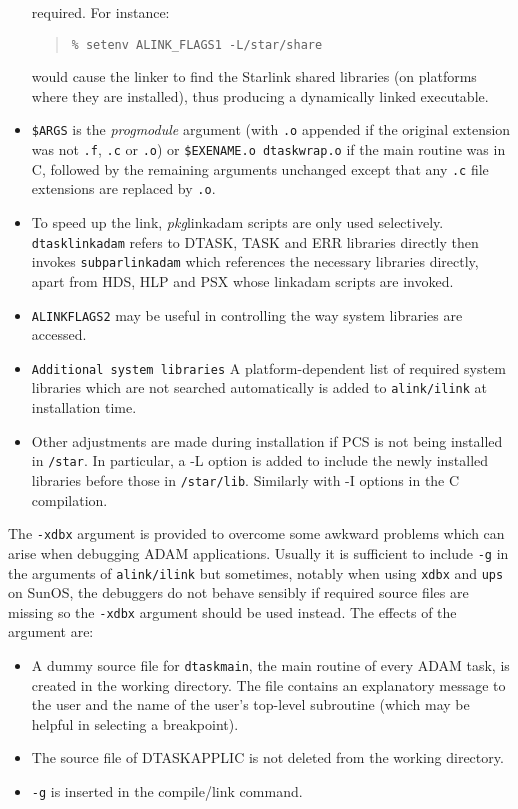 \documentclass[twoside,11pt]{article}
\renewcommand{\_}{\texttt{\symbol{95}}}
\begin{document}
\begin{itemize}
required. For instance:
\begin{quote} \begin{verbatim}
% setenv ALINK_FLAGS1 -L/star/share 
\end{verbatim} \end{quote}
would cause the linker to find the Starlink
shared libraries (on platforms where they are installed), thus producing a
dynamically linked executable.
\item \texttt{\$ARGS} is the \textit{prog\_module} argument (with \texttt{.o} 
appended if the original extension was not \texttt{.f}, \texttt{.c} or 
\texttt{.o})
or \texttt{\$EXENAME.o dtask\_wrap.o} if the main routine was in C, followed 
by the remaining arguments unchanged except that any \texttt{.c} file 
extensions are replaced by \texttt{.o}.
\item To speed up the link, \textit{pkg}\_link\_adam scripts are only used
selectively. 
\texttt{dtask\_link\_adam} refers to DTASK, TASK and ERR libraries directly then
invokes \texttt{subpar\_link\_adam} which references the necessary
libraries directly, apart from HDS, HLP and PSX whose link\_adam scripts are
invoked.
\item \texttt{ALINK\_FLAGS2} may be useful in controlling the way system
libraries are accessed.
\item \texttt{Additional system libraries} A platform-dependent list of 
required system libraries which are not searched automatically is added to 
\texttt{alink/ilink} at installation time.
\item Other adjustments are made during installation if PCS is not being
installed in \texttt{/star}. 
In particular, a -L option is added to include the newly installed libraries 
before those in \texttt{/star/lib}.
Similarly with -I options in the C compilation.
\end{itemize}
The \texttt{-xdbx} argument is provided to overcome some awkward problems which
can arise when debugging ADAM applications. Usually it is sufficient to
include \texttt{-g} in the arguments of \texttt{alink/ilink} but sometimes, 
notably when using \texttt{xdbx} and \texttt{ups} on SunOS, the debuggers do 
not behave sensibly if required source files are missing so the \texttt{-xdbx} 
argument should be used instead.
The effects of the argument are:
\begin{itemize}
\item A dummy source file for \texttt{dtask\_main}, the main routine of every 
ADAM task, is created in the working directory. 
The file contains an explanatory message to the user and the name of the 
user's top-level subroutine (which may be helpful in selecting a breakpoint).
\item The source file of DTASK\_APPLIC is not deleted from the working 
directory.
\item \texttt{-g} is inserted in the compile/link command.
\end{itemize}
\newpage
\end{document}
